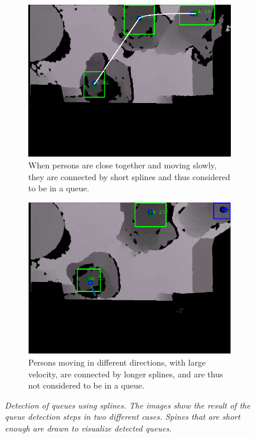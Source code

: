 \begin{figure}[H]
\centering
\begin{subfigure}{.5\textwidth}
  \centering
  \includegraphics[width=0.9\linewidth]{images/visibleQueue.png}
  \caption{When persons are close together and moving slowly, \\
  			 they are connected by short splines and thus considered\\
  			  to be in a queue.}
  \label{fig:visible_queue}
\end{subfigure}%
\begin{subfigure}{.5\textwidth}
  \centering
  \includegraphics[width=0.9\linewidth]{images/noQueue.png}
  \caption{Persons moving in different directions, with large velocity, are connected by longer splines, and are thus not considered to be in a queue.}
  \label{fig:no_queue}
\end{subfigure}
\caption[Queue detection]{\textit{Detection of queues using splines. The images show the result of the queue detection steps in two different cases. Spines that are short enough are drawn to visualize detected queues.}}
\label{fig:queue_detection}
\end{figure}



